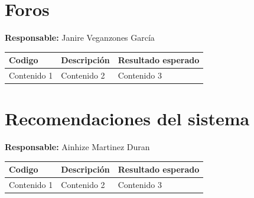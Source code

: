 ﻿\documentclass{report}
\begin{document}
        \section{Foros}
            \begin{center}
                \textbf{Responsable:} Janire Veganzones García\\
                \begin{longtable}{|m{2cm}|m{4cm}|m{4cm}|}
                    \hline
                    Codigo & Descripción & Resultado esperado \\
                    \hline
                    \endhead
                    \hline
                    Contenido 1 & Contenido 2 & Contenido 3 \\
                    \hline
                \end{longtable}
            \end{center}
            \clearpage
        \section{Recomendaciones del sistema}
            \begin{center}
                \textbf{Responsable:} Ainhize Martinez Duran\\
                \begin{longtable}{|m{2cm}|m{4cm}|m{4cm}|}
                    \hline
                    Codigo & Descripción & Resultado esperado \\
                    \hline
                    \endhead
                    \hline
                    Contenido 1 & Contenido 2 & Contenido 3 \\
                    \hline
                \end{longtable}
            \end{center}
            \clearpage
\end{document}
